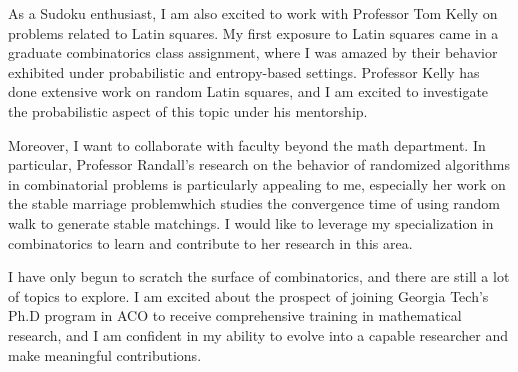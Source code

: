 \documentclass[12pt]{article}
\begin{document}
As a Sudoku enthusiast, I am also excited to work with Professor Tom Kelly on problems related to
Latin squares. My first exposure to Latin squares came in a graduate combinatorics class assignment,
where I was amazed by their behavior exhibited under probabilistic and entropy-based settings.
Professor Kelly has done extensive work on random Latin squares, and I am excited to investigate the
probabilistic aspect of this topic under his mentorship. 

Moreover, I want to collaborate with faculty beyond the math department. In particular, Professor
Randall's research on the behavior of randomized algorithms in combinatorial problems is
particularly appealing to me, especially her work on the stable marriage
problem\cite{inproceedings}which studies the convergence time of using random walk to generate
stable matchings. I would like to leverage my specialization in combinatorics to learn and
contribute to her research in this area.

I have only begun to scratch the surface of combinatorics, and there are still a lot of topics to
explore. I am excited about the prospect of joining Georgia Tech's Ph.D program in ACO to receive
comprehensive training in mathematical research, and I am confident in my ability to evolve into a
capable researcher and make meaningful contributions.  

\newpage



\end{document}
